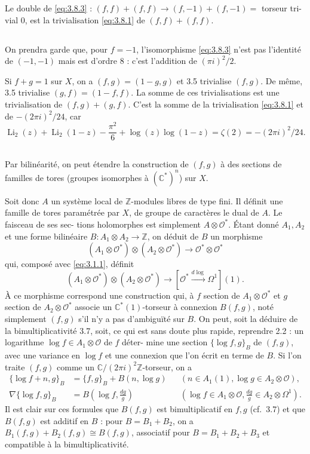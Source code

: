 \documentclass[12pt,a4paper]{article}
\theoremstyle{plain}
\theoremstyle{definition}
\theoremstyle{remark}
\newcommand{\cO}{\mathcal{O}}
\newcommand{\Z}{\mathbb{Z}}
\newcommand{\C}{\mathbb{C}}
\providecommand{\cO}{\mathcal{O}}
\begin{document}
Le double de \eqref{eq:3.8.3} : $(f,f) + (f,f) \to (f,-1) + (f,-1) = {}$ torseur tri-
vial $0$, est la trivialisation \eqref{eq:3.8.1} de $(f,f) + (f,f)$.

\subsection{}

On prendra garde que, pour $f = -1$, l'isomorphisme \eqref{eq:3.8.3} n'est pas
l'identité de $(-1, -1)$ mais est d'ordre $8$ : c'est l'addition de $(\pi i)^2/2$.

Si $f + g = 1$ sur $X$, on a $(f,g) = (1-g, g)$ et 3.5 trivialise $(f,g)$. De même,
3.5 trivialise $(g,f) = (1-f, f)$. La somme de ces trivialisations est une trivialisation
de $(f,g) + (g,f)$. C'est la somme de la trivialisation \eqref{eq:3.8.1} et de $-(2\pi i)^2/24$, car
\[
\operatorname{Li}_2(z) + \operatorname{Li}_2(1-z) - \frac{\pi^2}{6} + \log(z) \log(1-z) = \zeta(2) = -(2\pi i)^2/24.
\]

\subsection{}

Par bilinéarité, on peut étendre la construction de $(f,g)$ à des sections de
familles de tores (groupes isomorphes à $(\C^*)^n$) sur $X$.

Soit donc $A$ un système local de $\Z$-modules libres de type fini. Il définit une famille
de tores paramétrée par $X$, de groupe de caractères le dual de $A$. Le faisceau de ses sec-
tions holomorphes est simplement $A \otimes \cO^*$. Étant donné $A_1, A_2$ et une forme bilinéaire
$B : A_1 \otimes A_2 \to \Z$, on déduit de $B$ un morphisme
\[
(A_1 \otimes \cO^*) \otimes (A_2 \otimes \cO^*) \to \cO^* \otimes \cO^*
\]
qui, composé avec \eqref{eq:3.1.1}, définit
\[
(A_1 \otimes \cO^*) \otimes (A_2 \otimes \cO^*) \to [\cO^* \xrightarrow{d\log} \Omega^1](1).
\]
À ce morphisme correspond une construction qui, à $f$ section de $A_1 \otimes \cO^*$ et $g$ section
de $A_2 \otimes \cO^*$ associe un $\C^*(1)$-torseur à connexion $B(f,g)$, noté simplement $(f,g)$ s'il
n'y a pas d'ambiguïté sur $B$. On peut, soit la déduire de la bimultiplicativité 3.7, soit,
ce qui est sans doute plus rapide, reprendre 2.2 : un logarithme $\log f \in A_1 \otimes \cO$ de $f$ déter-
mine une section $\{\log f, g\}_B$ de $(f,g)$, avec une variance en $\log f$ et une connexion que
l'on écrit en terme de $B$. Si l'on traite $(f,g)$ comme un $\C/(2\pi i)^2\Z$-torseur, on a
\begin{align}
\{\log f + n, g\}_B &= \{f,g\}_B + B(n, \log g) && (n \in A_1(1), \log g \in A_2 \otimes \cO), \label{eq:3.10.1} \\
\nabla\{\log f, g\}_B &= B(\log f, \frac{dg}{g}) && (\log f \in A_1 \otimes \cO, \frac{dg}{g} \in A_2 \otimes \Omega^1). \label{eq:3.10.2}
\end{align}
Il est clair sur ces formules que $B(f,g)$ est bimultiplicatif en $f, g$ (cf.~3.7) et que
$B(f,g)$ est additif en $B$ : pour $B = B_1 + B_2$, on a $B_1(f,g) + B_2(f,g) \cong B(f,g)$, associatif
pour $B = B_1 + B_2 + B_3$ et compatible à la bimultiplicativité.
\end{document}
